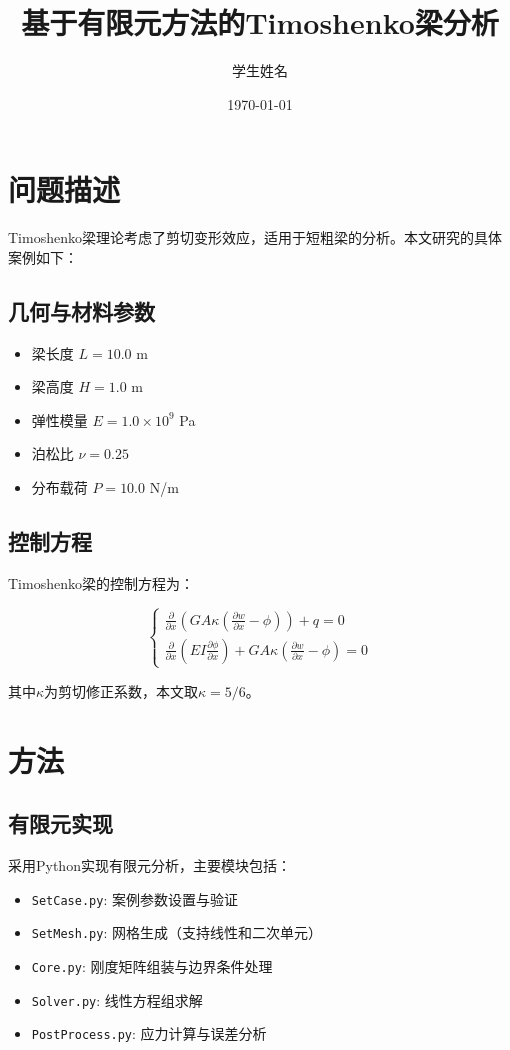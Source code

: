 \documentclass[a4paper,12pt]{article}
\title{基于有限元方法的Timoshenko梁分析}
\author{学生姓名}
\date{\today}
\begin{document}
\maketitle

\section{问题描述}
Timoshenko梁理论考虑了剪切变形效应，适用于短粗梁的分析。本文研究的具体案例如下：

\subsection{几何与材料参数}
\begin{itemize}
\item 梁长度 $L = 10.0$ m
\item 梁高度 $H = 1.0$ m
\item 弹性模量 $E = 1.0 \times 10^9$ Pa
\item 泊松比 $\nu = 0.25$
\item 分布载荷 $P = 10.0$ N/m
\end{itemize}

\subsection{控制方程}
Timoshenko梁的控制方程为：

\begin{equation}
\begin{cases}
\frac{\partial}{\partial x}\left(GA\kappa\left(\frac{\partial w}{\partial x} - \phi\right)\right) + q = 0 \\
\frac{\partial}{\partial x}\left(EI\frac{\partial \phi}{\partial x}\right) + GA\kappa\left(\frac{\partial w}{\partial x} - \phi\right) = 0
\end{cases}
\end{equation}

其中$\kappa$为剪切修正系数，本文取$\kappa = 5/6$。

\section{方法}
\subsection{有限元实现}
采用Python实现有限元分析，主要模块包括：

\begin{itemize}
\item \texttt{SetCase.py}: 案例参数设置与验证
\item \texttt{SetMesh.py}: 网格生成（支持线性和二次单元）
\item \texttt{Core.py}: 刚度矩阵组装与边界条件处理
\item \texttt{Solver.py}: 线性方程组求解
\item \texttt{PostProcess.py}: 应力计算与误差分析
\end{itemize}
\end{document}
